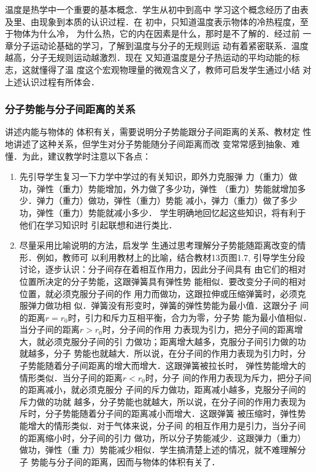 温度是热学中一个重要的基本概念．学生从初中到高中
学习这个概念经历了由表及里、由现象到本质的认识过程．在
初中，只知道温度表示物体的冷热程度，至于物体为什么冷，
为什么热，它的内在因素是什么，那时是不了解的．经过前
一章分子运动论基础的学习，了解到温度与分子的无规则运
动有着紧密联系．温度越高，分子无规则运动越激烈．现在
又知道温度是分子热运动的平均动能的标志，这就懂得了温
度这个宏观物理量的微观含义了，教师可启发学生通过小结
对上述认识过程有所体会．

\subsubsection{分子势能与分子间距离的关系} 讲述内能与物体的
体积有关，需要说明分子势能跟分子间距离的关系、教材定
性地讲述了这种关系，但学生对分子势能随分子间距离而改
变常常感到抽象、难懂．为此，建议教学时注意以下各点：
\begin{enumerate}
\item 
先引导学生复习一下力学中学过的有关知识，即外力克服弹
力（重力）做功，弹性（重力）势能增加，外力做了多少功，弹性
（重力）势能就增加多少．弹力（重力）做功，弹性（重力）势能
减小，弹力（重力）做了多少功，弹性（重力）势能就减小多少．
学生明确地回忆起这些知识，将有利于他们在学习知识时
引起联想和进行类比．    
\item 尽量采用比喻说明的方法，启发学
生通过思考理解分子势能随距离改变的情形．例如，教师可
以利用教材上的比喻，结合教材13页图1.7, 引导学生分段
讨论，逐步认识：分子间存在着相互作用力，因此分子间具有
由它们的相对位置所决定的分子势能，这跟弹簧具有弹性势
能相似．要改变分子间的相对位置，就必须克服分子间的作
用力而做功，这跟拉伸或压缩弹簧时，必须克服弹力做功相
似．弹簧没有形变时，弹簧的弹性势能为最小值．这跟分子
间的距离$r=r_0$时，引力和斥力互相平衡，合力为零，分子势
能为最小值相似．当分子间的距离$r>r_0$时，分子间的作用
力表现为引力，把分子间的距离增大，就必须克服分子间的引
力做功；距离增大越多，克服分子间引力做的功就越多，分子
势能也就越大．所以说，在分子间的作用力表现为引力时，分
子势能随着分子间距离的增大而增大．这跟弹簧被拉长时，
弹性势能增大的情形类似．当分子间的距离$r<r_0$时，分子
间的作用力表现为斥力，把分子间的距离减小，就必须克服分
子间的斥力做功，距离减小越多，克服分子间的斥力做的功就
越多，分子势能也就越大，所以说，在分子间的作用力表现为
斥时，分子势能随着分子间的距离减小而增大．这跟弹簧
被压缩时，弹性势能增大的情形类似．对于气体来说，分子间
的相互作用力是引力，当分子间的距离缩小时，分子间的引力
做功，所以分子势能减少．这跟弹力（重力）做功，弹性（重
力）势能减少相似．学生搞清楚上述的情况，就不难理解分子
势能与分子间的距离，因而与物体的体积有关了．
\end{enumerate}

